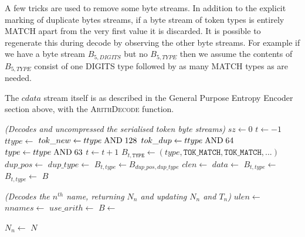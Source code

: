 \documentclass[a4paper]{article}
\begin{document}
A few tricks are used to remove some byte streams.  In addition to the explicit marking of duplicate bytes streams, if a byte stream of token types is entirely MATCH apart from the very first value it is discarded.  It is possible to regenerate this during decode by observing the other byte streams.  For example if we have a byte stream $B_{5,DIGITS}$ but no $B_{5,TYPE}$ then we assume the contents of $B_{5,TYPE}$ consist of one DIGITS type followed by as many MATCH types as are needed.

The $cdata$ stream itself is as described in the General Purpose Entropy Encoder section above, with the \textsc{ArithDecode} function.

\begin{algorithmic}[1]
\Statex
\Statex \textit{(Decodes and uncompressed the serialised token byte streams)}
  \State $sz \gets 0$
  \State $t \gets -1$
  \Repeat
    \State $ttype \gets$ 
    \State $tok\_new \gets ttype \bitand 128$
    \State $tok\_dup \gets ttype \bitand 64$
    \State $type \gets ttype \bitand 63$
      \State $t \gets t+1$
        \State $B_{t,\texttt{TYPE}} \gets (type, \texttt{TOK\_MATCH}, \texttt{TOK\_MATCH}, ...)$
      \EndIf
    \EndIf
    \Statex
       \State $dup\_pos \gets$ 
       \State $dup\_type \gets$ 
       \State $B_{t,type} \gets B_{dup\_pos,dup\_type}$
    \Else
      \State $clen \gets$ 
      \State $data \gets$ 
        \State $B_{t,type} \gets$ 
      \Else
        \State $B_{t,type} \gets$ 
      \EndIf
    \EndIf
  \State \Return $B$
\EndFunction
\end{algorithmic}

\begin{algorithmic}[1]
\Statex
\Statex \textit{(Decodes the $n^{th}$ name, returning $N_n$ and updating $N_n$ and $T_n$)}
  \State $ulen \gets$ 
  \State $nnames \gets$ 
  \State $use\_arith \gets$ 
  \State $B \gets$ 

    \State $N_n \gets$ 
  \EndFor
  \State \Return $N$
\EndFunction
\end{algorithmic}
\end{document}
